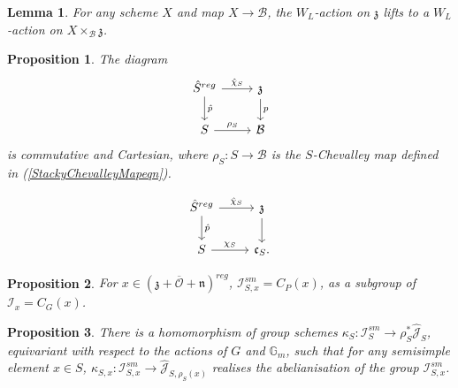 \documentclass[10pt,a4paper]{amsart}
\newtheorem{lemma}{Lemma}
\newtheorem{proposition}{Proposition}
\begin{document}
\begin{lemma}\label{WLInvariancelem}
    For any scheme $X$ and map $X \rightarrow \mathcal B$, the $W_L$-action on $\mathfrak{z}$ lifts to a $W_L$-action on $X \times_{\mathcal B} \mathfrak{z}$.
\end{lemma}

\begin{proposition}\label{StackyGSprp}
    The diagram
    \begin{equation}\label{StackyGSeqn}
        \begin{tikzcd}
         \hat{S}^{reg} \arrow[r, "\hat{\chi}_S"] \arrow[d, "\hat{p}"] & \mathfrak{z} \arrow[d, "p"] \\
            S \arrow[r, "\rho_S"]                                       & \mathcal B              
        \end{tikzcd}
    \end{equation}
    is commutative and Cartesian, where $\rho_S:S \rightarrow \mathcal B$ is the $S$-Chevalley map defined in (\ref{StackyChevalleyMapeqn}).
\end{proposition}

\begin{equation}\label{GSDiagrameqn}
        \begin{tikzcd}
         \hat{S}^{reg} \arrow[r, "\hat{\chi}_S"] \arrow[d, "\hat{p}"] & \mathfrak{z} \arrow[d] \\
            S \arrow[r, "\chi_S"]                                       & \mathfrak{c}_S.              
        \end{tikzcd}
    \end{equation}

\begin{proposition}\label{ParabolicCentraliserprp}
    For $x \in (\mathfrak{z} +\overline{\mathcal O} +\mathfrak{n})^{reg}$, $\mathcal I_{S,x}^{sm} = C_P(x)$, as a subgroup of $\mathcal I_x = C_G(x)$.
\end{proposition}

\begin{proposition}\label{CameralHomprp}
There is a homomorphism of group schemes $\kappa_S:\mathcal I^{sm}_S \rightarrow \mathcal \rho_S^*\hat{\mathcal J}_S$, equivariant with respect to the actions of $G$ and $\mathbb{G}_m$, such that for any semisimple element $x \in S$, $\kappa_{S,x}: \mathcal I^{sm}_{S,x} \rightarrow \hat{\mathcal J}_{S, \rho_S(x)}$ realises the abelianisation of the group $\mathcal I^{sm}_{S,x}$.
\end{proposition}
\end{document}
